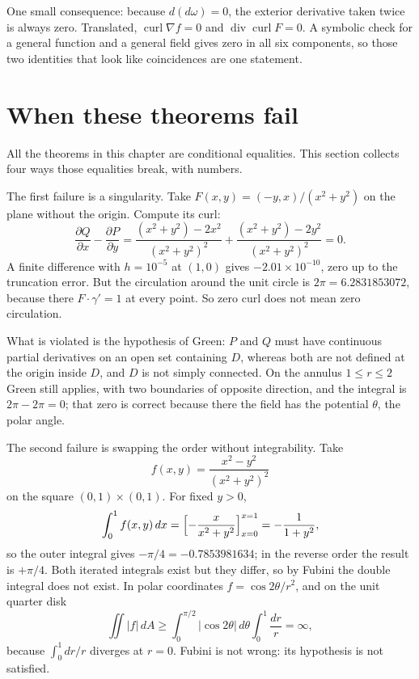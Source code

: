 One small consequence: because $d(d\omega)=0$, the exterior derivative taken twice is always zero.
Translated, $\operatorname{curl}\nabla f=0$ and
$\operatorname{div}\operatorname{curl}F=0$. A symbolic check for a general function
and a general field gives zero in all six components, so those two identities that look
like coincidences are one statement.

\section{When these theorems fail}

All the theorems in this chapter are conditional equalities. This section collects four
ways those equalities break, with numbers.

The first failure is a singularity. Take $F(x,y)=(-y,x)/(x^{2}+y^{2})$
on the plane without the origin. Compute its curl:
\[
\frac{\partial Q}{\partial x}-\frac{\partial P}{\partial y}
=\frac{(x^{2}+y^{2})-2x^{2}}{(x^{2}+y^{2})^{2}}
+\frac{(x^{2}+y^{2})-2y^{2}}{(x^{2}+y^{2})^{2}}=0 .
\]
A finite difference with $h=10^{-5}$ at $(1,0)$ gives $-2.01\times10^{-10}$, zero up to
the truncation error. But the circulation
around the unit circle is $2\pi=6.2831853072$, because there
$F\cdot\gamma'=1$ at every point. So zero curl does not mean zero circulation.

What is violated is the hypothesis of Green: $P$ and $Q$ must have continuous partial
derivatives on an open set containing $D$, whereas both are not
defined at the origin inside $D$, and $D$ is not simply connected. On the annulus $1\le r\le2$ Green still applies, with two boundaries
of opposite direction, and the integral is $2\pi-2\pi=0$; that zero is correct because there
the field has the potential $\theta$, the polar angle.

The second failure is swapping the order without integrability. Take
\[
f(x,y)=\frac{x^{2}-y^{2}}{(x^{2}+y^{2})^{2}}
\]
on the square $(0,1)\times(0,1)$. For fixed $y>0$,
\[
\int_{0}^{1}f(x,y)\,dx=\Bigl[-\frac{x}{x^{2}+y^{2}}\Bigr]_{x=0}^{x=1}
=-\frac{1}{1+y^{2}},
\]
so the outer integral gives $-\pi/4=-0.7853981634$; in the reverse order
the result is $+\pi/4$. Both iterated integrals exist but they differ, so by
Fubini the double integral does not exist. In polar coordinates
$f=\cos2\theta/r^{2}$, and on the unit quarter disk
\[
\iint|f|\,dA\ge\int_{0}^{\pi/2}|\cos2\theta|\,d\theta
\int_{0}^{1}\frac{dr}{r}=\infty ,
\]
because $\int_{0}^{1}dr/r$ diverges at $r=0$. Fubini is not wrong: its hypothesis
is not satisfied.

